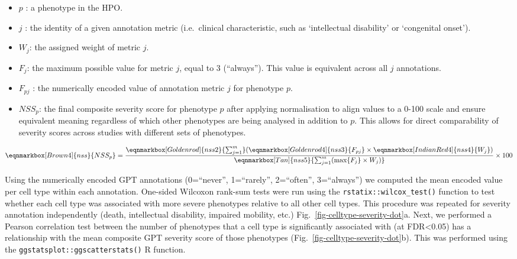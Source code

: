\documentclass[
]{article}
\begin{document}
\begin{itemize}
\item
  \(p\) : a phenotype in the HPO.
\item
  \(j\) : the identity of a given annotation metric (i.e.~clinical
  characteristic, such as `intellectual disability' or `congenital
  onset').
\item
  \(W_j\): the assigned weight of metric \(j\).
\item
  \(F_j\): the maximum possible value for metric \(j\), equal to 3
  (``always''). This value is equivalent across all \(j\) annotations.
\item
  \(F_{pj}\) : the numerically encoded value of annotation metric \(j\)
  for phenotype \(p\).
\item
  \(NSS_p\): the final composite severity score for phenotype \(p\)
  after applying normalisation to align values to a 0-100 scale and
  ensure equivalent meaning regardless of which other phenotypes are
  being analysed in addition to \(p\). This allows for direct
  comparability of severity scores across studies with different sets of
  phenotypes.
\end{itemize}

\hfill\break
\hfill\break

\begin{equation*}
  \eqnmarkbox[Brown4]{nss}{NSS_p}
  =
  \frac{ 
    \eqnmarkbox[Goldenrod]{nss2}{\sum_{j=1}^{m}} 
    (
      \eqnmarkbox[Goldenrod4]{nss3}{F_{pj}}
      \times 
      \eqnmarkbox[IndianRed4]{nss4}{W_j}
    )
    }{
    \eqnmarkbox[Tan]{nss5}{\sum_{j=1}^{m}(\max\{F_j\} \times W_j)} 
  } \times 100
\end{equation*}

\hfill\break

Using the numerically encoded GPT annotations (0=``never'',
1=``rarely'', 2=``often'', 3=``always'') we computed the mean encoded
value per cell type within each annotation. One-sided Wilcoxon rank-sum
tests were run using the \texttt{rstatix::wilcox\_test()} function to
test whether each cell type was associated with more severe phenotypes
relative to all other cell types. This procedure was repeated for
severity annotation independently (death, intellectual disability,
impaired mobility, etc.) Fig.~\ref{fig-celltype-severity-dot}a. Next, we
performed a Pearson correlation test between the number of phenotypes
that a cell type is significantly associated with (at FDR\textless0.05)
has a relationship with the mean composite GPT severity score of those
phenotypes (Fig.~\ref{fig-celltype-severity-dot}b). This was performed
using the \texttt{ggstatsplot::ggscatterstats()} R function.
\end{document}
